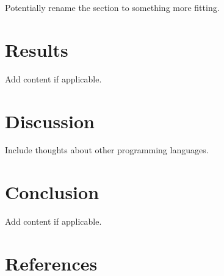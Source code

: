 \documentclass{article}
\begin{document}
Potentially rename the section to something more fitting.

\section{Results}

Add content if applicable.

\section{Discussion}

Include thoughts about other programming languages.

\section{Conclusion}

Add content if applicable.

\newpage
\section{References}
\printbibliography
\end{document}
